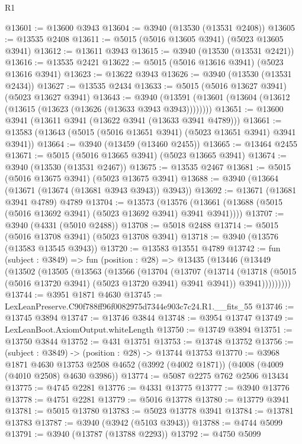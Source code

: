 \begin{lexlean}{R1}
\begin{coremodule}
@13601 := @13600 @3943
@13604 := @3940 (@13530 (@13531 @2408))
@13605 := @13535 @2408
@13611 := @5015 (@5016 @13605 @3941) (@5023 @13605 @3941)
@13612 := @13611 @3943
@13615 := @3940 (@13530 (@13531 @2421))
@13616 := @13535 @2421
@13622 := @5015 (@5016 @13616 @3941) (@5023 @13616 @3941)
@13623 := @13622 @3943
@13626 := @3940 (@13530 (@13531 @2434))
@13627 := @13535 @2434
@13633 := @5015 (@5016 @13627 @3941) (@5023 @13627 @3941)
@13643 := @3940 (@13591 (@13601 (@13604 (@13612 (@13615 (@13623 (@13626 (@13633 @3943 @3943))))))))
@13651 := @13600 @3941 (@13611 @3941 (@13622 @3941 (@13633 @3941 @4789)))
@13661 := @13583 (@13643 (@5015 (@5016 @13651 @3941) (@5023 @13651 @3941) @3941 @3941))
@13664 := @3940 (@13459 (@13460 @2455))
@13665 := @13464 @2455
@13671 := @5015 (@5016 @13665 @3941) (@5023 @13665 @3941)
@13674 := @3940 (@13530 (@13531 @2467))
@13675 := @13535 @2467
@13681 := @5015 (@5016 @13675 @3941) (@5023 @13675 @3941)
@13688 := @3940 (@13664 (@13671 (@13674 (@13681 @3943 @3943)) @3943))
@13692 := @13671 (@13681 @3941 @4789) @4789
@13704 := @13573
    (@13576 (@13661 (@13688 (@5015 (@5016 @13692 @3941) (@5023 @13692 @3941) @3941 @3941))))
@13707 := @3940 (@4331 (@5010 @2488))
@13708 := @5018 @2488
@13714 := @5015 (@5016 @13708 @3941) (@5023 @13708 @3941)
@13718 := @3940 (@13576 (@13583 @13545 @3943))
@13720 := @13583 @13551 @4789
@13742 := fun (subject : @3849) =>
  fun (position : @28) =>
  @13435
    (@13446
      (@13449
        (@13502
          (@13505
            (@13563
              (@13566
                (@13704
                  (@13707
                    (@13714
                      (@13718 (@5015 (@5016 @13720 @3941) (@5023 @13720 @3941) @3941 @3941))
                      @3941)))))))))
@13744 := @3951 @1871 @4630
@13745 := LexLeanPreserve.C90f788ff96f0082975d7344e903c7c24.R1.__fits_55
@13746 := @13745 @3894
@13747 := @13746 @3844
@13748 := @3954 @13747
@13749 := LexLeanBoot.AxiomOutput.whiteLength
@13750 := @13749 @3894
@13751 := @13750 @3844
@13752 := @431 @13751
@13753 := @13748 @13752
@13756 := (subject : @3849) -> (position : @28) -> @13744 @13753
@13770 := @3968
    @1871
    @4630
    @13753
    @2508
    @4652
    (@3992 (@4002 @1871))
    (@4008 (@4009 (@4010 @2508) @4630 @3986))
@13774 := @5087 @2275 @762 @2506 @13434
@13775 := @4745 @2281
@13776 := @4331 @13775
@13777 := @3940 @13776
@13778 := @4751 @2281
@13779 := @5016 @13778
@13780 := @13779 @3941
@13781 := @5015 @13780
@13783 := @5023 @13778 @3941
@13784 := @13781 @13783
@13787 := @3940 (@3942 (@5103 @3943))
@13788 := @4744 @5099
@13791 := @3940 (@13787 (@13788 @2293))
@13792 := @4750 @5099

\end{coremodule}
\end{lexlean}
